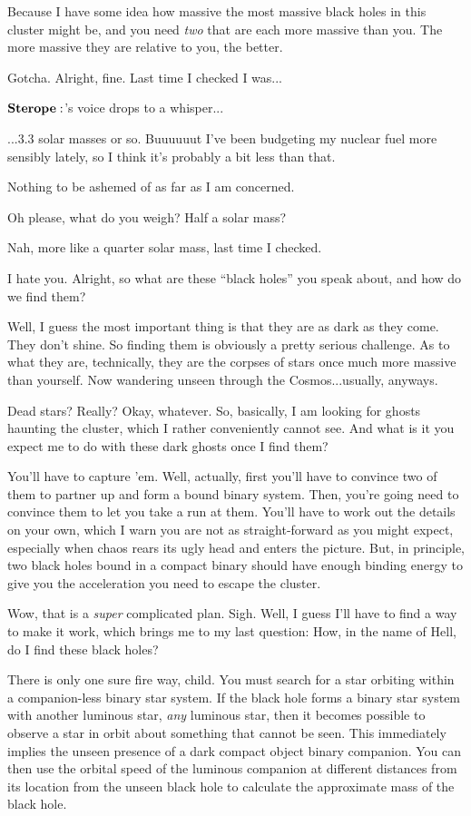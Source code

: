 \documentclass[main.tex]{subfiles}
\begin{document}
\Enrico Because I have some idea how massive the most massive black holes in this cluster might be, and you need \textit{two} that are each more massive than you.  The more massive they are relative to you, the better.

\Sterope Gotcha.  Alright, fine.  Last time I checked I was...

$\Sterope$'s voice drops to a whisper...

\Sterope ...3.3 solar masses or so.  Buuuuuut I've been budgeting my nuclear fuel more sensibly lately, so I think it's probably a bit less than that.  

\Enrico Nothing to be ashemed of as far as I am concerned.

\Sterope Oh please, what do you weigh?  Half a solar mass?

\Enrico Nah, more like a quarter solar mass, last time I checked.

\Sterope I hate you.  Alright, so what are these ``black holes'' you speak about, and how do we find them?

\Enrico Well, I guess the most important thing is that they are as dark as they come.  They don't shine.  So finding them is obviously a pretty serious challenge.  As to what they are, technically, they are the corpses of stars once much more massive than yourself.  Now wandering unseen through the Cosmos...usually, anyways.

\Sterope  Dead stars?  Really?  Okay, whatever.  So, basically, I am looking for ghosts haunting the cluster, which I rather conveniently cannot see.  And what is it you expect me to do with these dark ghosts once I find them?

\Enrico You'll have to capture 'em.  Well, actually, first you'll have to convince two of them to partner up and form a bound binary system.  Then, you're going need to convince them to let you take a run at them.  You'll have to work out the details on your own, which I warn you are not as straight-forward as you might expect, especially when chaos rears its ugly head and enters the picture.  But, in principle, two black holes bound in a compact binary should have enough binding energy to give you the acceleration you need to escape the cluster.  

\Sterope Wow, that is a \textit{super} complicated plan.  Sigh.  Well, I guess I'll have to find a way to make it work, which brings me to my last question:  How, in the name of Hell, do I find these black holes?

\Enrico There is only one sure fire way, child.  You must search for a star orbiting within a companion-less binary star system.  If the black hole forms a binary star system with another luminous star, \textit{any} luminous star, then it becomes possible to observe a star in orbit about something that cannot be seen.  This immediately implies the unseen presence of a dark compact object binary companion.  You can then use the orbital speed of the luminous companion at different distances from its location from the unseen black hole to calculate the approximate mass of the black hole.  
\end{document}
